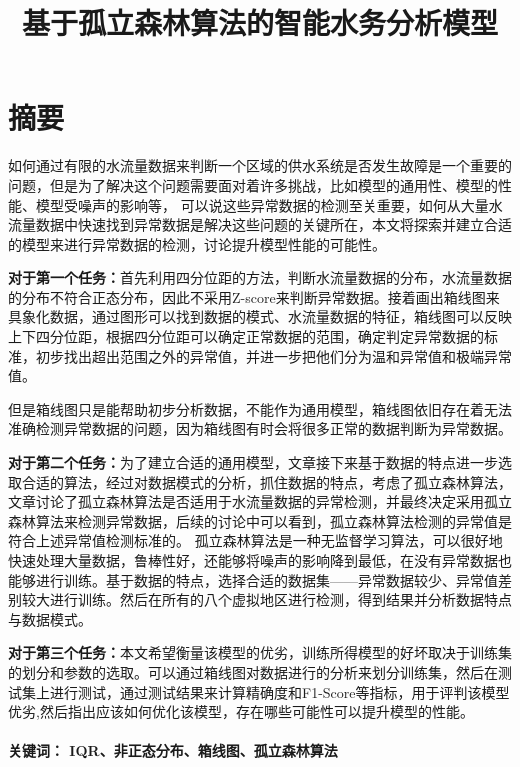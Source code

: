 \documentclass[UTF8]{article}
\begin{document}
	\title{\heiti \textbf {基于孤立森林算法的智能水务分析模型}\vspace{-2em}}
	\date{}
	\author{}
	\maketitle
	\section*{\centering 摘要}
		\par 如何通过有限的水流量数据来判断一个区域的供水系统是否发生故障是一个重要的问题，但是为了解决这个问题需要面对着许多挑战，比如模型的通用性、模型的性能、模型受噪声的影响等，
		可以说这些异常数据的检测至关重要，如何从大量水流量数据中快速找到异常数据是解决这些问题的关键所在，本文将探索并建立合适的模型来进行异常数据的检测，讨论提升模型性能的可能性。
		\par \textbf{对于第一个任务：}首先利用四分位距的方法，判断水流量数据的分布，水流量数据的分布不符合正态分布，因此不采用Z-score来判断异常数据。接着画出箱线图来具象化数据，通过图形可以找到数据的模式、水流量数据的特征，箱线图可以反映上下四分位距，根据四分位距可以确定正常数据的范围，确定判定异常数据的标准，初步找出超出范围之外的异常值，并进一步把他们分为温和异常值和极端异常值。
		\par 但是箱线图只是能帮助初步分析数据，不能作为通用模型，箱线图依旧存在着无法准确检测异常数据的问题，因为箱线图有时会将很多正常的数据判断为异常数据。
		\par \textbf{对于第二个任务：}为了建立合适的通用模型，文章接下来基于数据的特点进一步选取合适的算法，经过对数据模式的分析，抓住数据的特点，考虑了孤立森林算法，文章讨论了孤立森林算法是否适用于水流量数据的异常检测，并最终决定采用孤立森林算法来检测异常数据，后续的讨论中可以看到，孤立森林算法检测的异常值是符合上述异常值检测标准的。
		孤立森林算法是一种无监督学习算法，可以很好地快速处理大量数据，鲁棒性好，还能够将噪声的影响降到最低，在没有异常数据也能够进行训练。基于数据的特点，选择合适的数据集——异常数据较少、异常值差别较大进行训练。然后在所有的八个虚拟地区进行检测，得到结果并分析数据特点与数据模式。
		\par \textbf{对于第三个任务：}本文希望衡量该模型的优劣，训练所得模型的好坏取决于训练集的划分和参数的选取。可以通过箱线图对数据进行的分析来划分训练集，然后在测试集上进行测试，通过测试结果来计算精确度和F1-Score等指标，用于评判该模型优劣,然后指出应该如何优化该模型，存在哪些可能性可以提升模型的性能。
		\\ 
		\\
		\textbf{\centering 关键词： IQR、非正态分布、箱线图、孤立森林算法}
		\newpage
\end{document}
